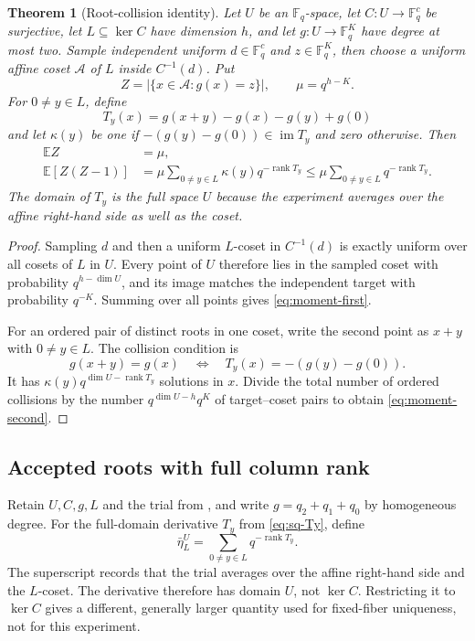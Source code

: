 \documentclass[11pt]{article}
\newtheorem{theorem}{Theorem}[section]
\newcommand{\F}{\mathbb F}
\newcommand{\rank}{\operatorname{rank}}
\newcommand{\im}{\operatorname{im}}
\begin{document}
\begin{theorem}[Root-collision identity]\label{thm:collision-identity}
Let $U$ be an $\F_q$-space, let $C:U\to\F_q^c$ be surjective, let
$L\subseteq\ker C$ have dimension $h$, and let
$g:U\to\F_q^K$ have degree at most two.  Sample independent uniform
$d\in\F_q^c$ and $z\in\F_q^K$, then choose a uniform affine coset $\mathcal A$
of $L$ inside $C^{-1}(d)$.  Put
\[
 Z=|\{x\in\mathcal A:g(x)=z\}|,
 \qquad \mu=q^{h-K}.
\]
For $0\ne y\in L$, define
\[
 T_y(x)=g(x+y)-g(x)-g(y)+g(0)
\]
and let $\kappa(y)$ be one if
$-(g(y)-g(0))\in\im T_y$ and zero otherwise.  Then
\begin{align}
 \mathbb EZ&=\mu,                                      \label{eq:moment-first}\\
 \mathbb E[Z(Z-1)]
 &=\mu\sum_{0\ne y\in L}\kappa(y)q^{-\rank T_y}
 \le \mu\sum_{0\ne y\in L}q^{-\rank T_y}.          \label{eq:moment-second}
\end{align}
The domain of $T_y$ is the full space $U$ because the experiment averages over
the affine right-hand side as well as the coset.
\end{theorem}

\begin{proof}
Sampling $d$ and then a uniform $L$-coset in $C^{-1}(d)$ is exactly uniform
over all cosets of $L$ in $U$.  Every point of $U$ therefore lies in the
sampled coset with probability $q^{h-\dim U}$, and its image matches the
independent target with probability $q^{-K}$.  Summing over all points gives
\eqref{eq:moment-first}.

For an ordered pair of distinct roots in one coset, write the second point as
$x+y$ with $0\ne y\in L$.  The collision condition is
\[
 g(x+y)=g(x)
 \quad\Longleftrightarrow\quad
 T_y(x)=-(g(y)-g(0)).
\]
It has $\kappa(y)q^{\dim U-\rank T_y}$ solutions in $x$.  Divide the total
number of ordered collisions by the number
$q^{\dim U-h}q^K$ of target--coset pairs to obtain
\eqref{eq:moment-second}.
\end{proof}

\subsection{Accepted roots with full column rank}

Retain $U,C,g,L$ and the trial from , and write
$g=q_2+q_1+q_0$ by homogeneous degree.  For the full-domain derivative $T_y$
from \eqref{eq:sq-Ty}, define
\begin{equation}
 \bar\eta_L^U=\sum_{0\ne y\in L}q^{-\rank T_y}. \label{eq:sq-etaU}
\end{equation}
The superscript records that the trial averages over the affine right-hand side
and the $L$-coset.  The derivative therefore has domain $U$, not $\ker C$.
Restricting it to $\ker C$ gives a different, generally larger quantity used
for fixed-fiber uniqueness, not for this experiment.
\end{document}
